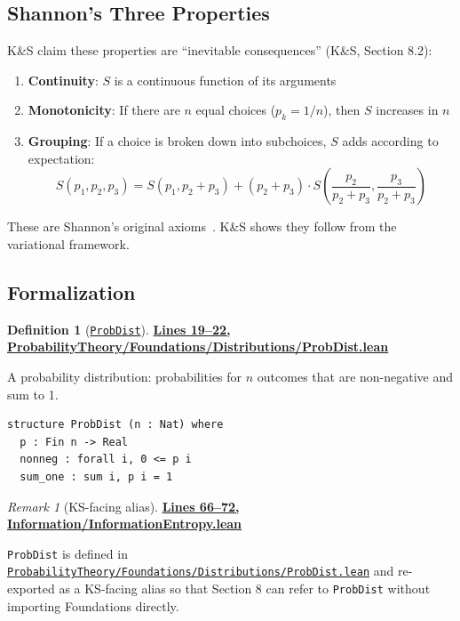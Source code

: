 \documentclass[11pt]{article}
\theoremstyle{definition}
\newtheorem{definition}[theorem]{Definition}
\theoremstyle{remark}
\newtheorem{remark}[theorem]{Remark}
\begin{document}
\subsection{Shannon's Three Properties}

K\&S claim these properties are ``inevitable consequences'' (K\&S, Section 8.2):

\begin{enumerate}
\item \textbf{Continuity}: $S$ is a continuous function of its arguments
\item \textbf{Monotonicity}: If there are $n$ equal choices ($p_k = 1/n$), then $S$ increases in $n$
\item \textbf{Grouping}: If a choice is broken down into subchoices, $S$ adds according to expectation:
\[ S(p_1, p_2, p_3) = S(p_1, p_2+p_3) + (p_2+p_3) \cdot S\left(\frac{p_2}{p_2+p_3}, \frac{p_3}{p_2+p_3}\right) \]
\end{enumerate}

These are Shannon's original axioms~\cite{Shannon1948}. K\&S shows they follow from the variational framework.

\subsection{Formalization}

\begin{definition}[\href{https://github.com/zariuq/ks-foundations-of-inference/blob/main/ProbabilityTheory/Foundations/Distributions/ProbDist.lean\#L19}{\texttt{ProbDist}}]
\textbf{\href{https://github.com/zariuq/ks-foundations-of-inference/blob/main/ProbabilityTheory/Foundations/Distributions/ProbDist.lean\#L19-L22}{Lines 19--22, ProbabilityTheory/Foundations/Distributions/ProbDist.lean}}

A probability distribution: probabilities for $n$ outcomes that are non-negative and sum to 1.
\end{definition}

\begin{lstlisting}[caption={Probability distribution}]
structure ProbDist (n : Nat) where
  p : Fin n -> Real
  nonneg : forall i, 0 <= p i
  sum_one : sum i, p i = 1
\end{lstlisting}

\begin{remark}[KS-facing alias]
\textbf{\href{https://github.com/zariuq/ks-foundations-of-inference/blob/main/KnuthSkilling/Information/InformationEntropy.lean\#L66-L72}{Lines 66--72, Information/InformationEntropy.lean}}

\texttt{ProbDist} is defined in\\
{\footnotesize\href{https://github.com/zariuq/ks-foundations-of-inference/blob/main/ProbabilityTheory/Foundations/Distributions/ProbDist.lean}{\texttt{ProbabilityTheory/Foundations/Distributions/ProbDist.lean}}} and re-exported as a KS-facing alias
so that Section 8 can refer to \texttt{ProbDist} without importing Foundations directly.
\end{remark}
\end{document}
